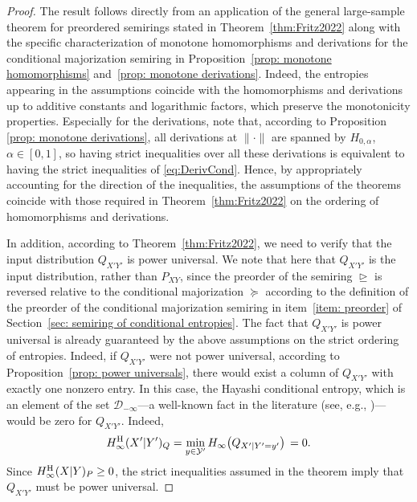 \documentclass[aps,pra,11pt,onecolumn,nofootinbib,tightenlines]{revtex4-2}
\theoremstyle{definition}
\newcommand{\rgeq}{\trianglerighteq}
\begin{document}
\begin{proof}
The result follows directly from an application of the general large-sample theorem for preordered semirings stated in Theorem~\ref{thm:Fritz2022} along with the specific characterization of monotone homomorphisms and derivations for the conditional majorization semiring in Proposition~\ref{prop: monotone homomorphisms} and~\ref{prop: monotone derivations}. Indeed, the entropies appearing in the assumptions coincide with the homomorphisms and derivations up to additive constants and logarithmic factors, which preserve the monotonicity properties. Especially for the derivations, note that, according to Proposition \ref{prop: monotone derivations}, all derivations at $\|\cdot\|$ are spanned by $H_{0,\alpha}$, $\alpha\in[0,1]$, so having strict inequalities over all these derivations is equivalent to having the strict inequalities of \eqref{eq:DerivCond}. Hence, by appropriately accounting for the direction of the inequalities, the assumptions of the theorems coincide with those required in Theorem~\ref{thm:Fritz2022} on the ordering of homomorphisms and derivations.

In addition, according to Theorem~\ref{thm:Fritz2022}, we need to verify that the input distribution $Q_{X'Y'}$ is power universal. We note that here that \(Q_{X'Y'}\) is the input distribution, rather than \(P_{XY}\), since the preorder of the semiring \(\rgeq\) is reversed relative to the conditional majorization \(\succeq\) according to the definition of the preorder of the conditional majorization semiring in item~\ref{item: preorder} of Section~\ref{sec: semiring of conditional entropies}.
The fact that $Q_{X'Y'}$ is power universal is already guaranteed by the above assumptions on the strict ordering of entropies. Indeed, if $Q_{X'Y'}$ were not power universal, according to Proposition~\ref{prop: power universals}, there would exist a column of $Q_{X'Y'}$ with exactly one nonzero entry. 
In this case, the Hayashi conditional entropy, which is an element of the set \(\mathcal{D}_{-\infty}\)—a well-known fact in the literature (see, e.g., \cite{gour2024inevitability})— would be zero for $Q_{X'Y'}$. Indeed,  
\begin{equation}
    H^{\rm{H}}_{\infty}(X'|Y')_Q = \min_{y \in \mathcal{Y}'}  H_{\infty}\bigl(Q_{X'|Y'=y'}\bigr) \, = 0.
\end{equation}
Since $ H^{\rm{H}}_{\infty}(X|Y)_P\geq0$, the strict inequalities assumed in the theorem imply that $Q_{X'Y'}$ must be power universal.
\end{proof}
\end{document}
